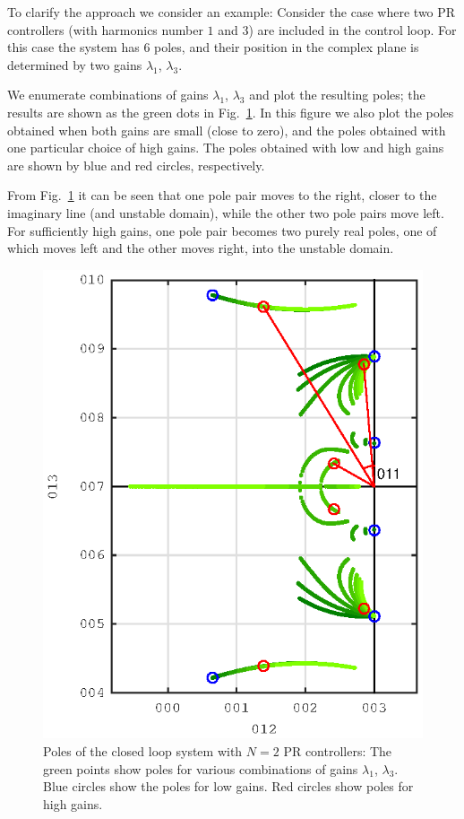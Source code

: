 \documentclass[conference,10pt]{IEEEtran}
\begin{document}
To clarify the approach we consider an example: Consider the case where two PR controllers (with harmonics number $1$ and $3$) are included in the control loop. For this case the system has $6$ poles, and their position in the complex plane is determined by  two gains $\lambda_1$, $\lambda_3$.

We enumerate combinations of gains $\lambda_1$, $\lambda_3$ and plot the resulting poles; the results are shown as the green dots in Fig.~\ref{fig:PoleExample}. In this figure we also plot the poles obtained when both gains are small (close to zero), and the poles obtained with one particular choice of high gains. The poles obtained with low and high gains are shown by blue and red circles, respectively.

From Fig.~\ref{fig:PoleExample} it can be seen that one pole pair moves to the right, closer to the imaginary line (and unstable domain), while the other two pole pairs move left. For sufficiently high gains, one pole pair becomes two purely real poles, one of which moves left and the other moves right, into the unstable domain.
\begin{figure}[!h]
\centering

\includegraphics{fig/root_locus_2D}
\caption{Poles of the closed loop system with $N=2$ PR controllers: The green points show poles for various combinations of gains $\lambda_1$,
$\lambda_3$. Blue circles show the poles for low gains. Red circles show poles for high gains. }
\label{fig:PoleExample}
\end{figure}
\end{document}
